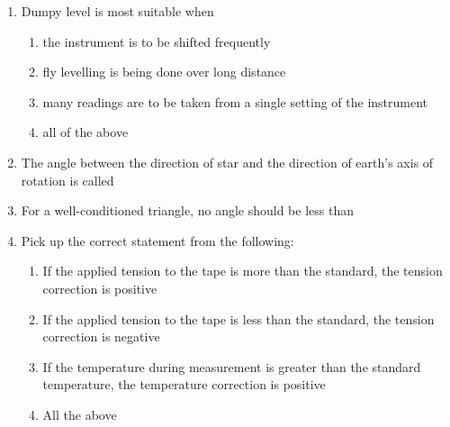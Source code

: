 \documentclass[11pt,a4paper]{article}
\begin{document}
\begin{enumerate}
\item{Dumpy level is most suitable when}
\begin{enumerate}[label=\Alph*.]
\item{the instrument is to be shifted frequently}
\item{fly levelling is being done over long distance}
\item{many readings are to be taken from a single setting of the instrument}
\item{all of the above}
\end{enumerate}
\item{The angle between the direction of star and the direction of earth's axis of rotation is called}
\\
\item{For a well-conditioned triangle, no angle should be less than}
\\
\item{Pick up the correct statement from the following:}
\begin{enumerate}[label=\Alph*.]
\item{If the applied tension to the tape is more than the standard, the tension correction is positive}
\item{If the applied tension to the tape is less than the standard, the tension correction is negative}
\item{If the temperature during measurement is greater than the standard temperature, the temperature correction is positive}
\item{All the above}
\end{enumerate}

\end{enumerate}
\end{document}
